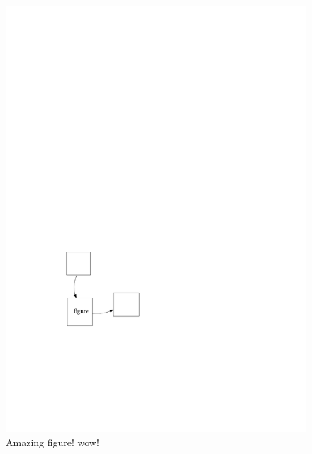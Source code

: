 \documentclass[a4paper,12pt]{memoir}
\begin{document}
\begin{figure}
\begin{minipage}{0.5\textwidth}
    \includegraphics[page=2]{myfigure.pdf}%
  \end{minipage}%
  \par
  \caption{Amazing figure! wow!}
\end{figure}
\end{document}
